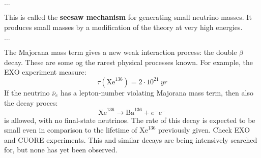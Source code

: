 \documentclass[../../main/main.tex]{subfiles}
\begin{document}
\begin{itemize}
	\( \dots  \)

	This is called the \textbf{seesaw mechanism} for generating small neutrino masses. It produces small masses by a modification of the theory at very high energies.

	\( \dots  \)

	The Majorana mass term gives a new weak interaction process: the double \( \beta \) decay. These are some og the rarest physical processes known. For example, the EXO experiment measure:
	\begin{equation}
		\tau(\text{Xe}^{136})
		=
		2 \cdot 10^{21} \ \si{yr}
		\label{eq:}
	\end{equation}
	If the neutrino \( \bar{\nu}_e \) has a lepton-number violating Majorana mass term, then also the decay proces:
	\begin{equation}
		\text{Xe}^{136}
		\longrightarrow
		\text{Ba}^{136} + e^-e^-
		\label{eq:}
	\end{equation}
	is allowed, with no final-state neutrinos. The rate of this decay is expected to be small even in comparison to the lifetime of \( \text{Xe}^{136} \) previously given.
	Check EXO and CUORE experiments. This and similar decays are being intensively searched for, but none has yet been observed.
\end{itemize}
\end{document}
